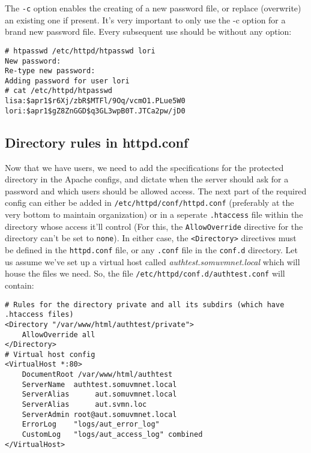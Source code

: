 \noindent
The \verb|-c| option enables the creating of a new password file, or replace (overwrite) an existing one if present. It's very important to only use the -c option for a brand new password file. Every subsequent use should be without any option:

\vspace{-15pt}
\begin{verbatim}
# htpasswd /etc/httpd/htpasswd lori
New password: 
Re-type new password: 
Adding password for user lori
# cat /etc/httpd/htpasswd
lisa:$apr1$r6Xj/zbR$MTFl/9Oq/vcmO1.PLue5W0
lori:$apr1$gZ8ZnGGD$q3GL3wpB0T.JTCa2pw/jD0
\end{verbatim}
\vspace{-15pt}	

\subsection{Directory rules in httpd.conf}
Now that we have users, we need to add the specifications for the protected directory in the Apache configs, and dictate when the server should ask for a password and which users should be allowed access. The next part of the required config can either be added in \verb|/etc/httpd/conf/httpd.conf| (preferably at the very bottom to maintain organization) or in a seperate \verb|.htaccess| file within the directory whose access it'll control (For this, the \verb|AllowOverride| directive for the directory can't be set to \verb|none|). In either case, the \verb|<Directory>| directives must be defined in the \verb|httpd.conf| file, or any \verb|.conf| file in the \verb|conf.d| directory. Let us assume we've set up a virtual host called \textit{authtest.somuvmnet.local} which will house the files we need. So, the file \verb|/etc/httpd/conf.d/authtest.conf| will contain:

\vspace{-15pt}
\begin{verbatim}
# Rules for the directory private and all its subdirs (which have .htaccess files)
<Directory "/var/www/html/authtest/private">
	AllowOverride all
</Directory>
# Virtual host config
<VirtualHost *:80>
	DocumentRoot /var/www/html/authtest
	ServerName 	authtest.somuvmnet.local
	ServerAlias 	 aut.somuvmnet.local
	ServerAlias 	 aut.svmn.loc
	ServerAdmin	root@aut.somuvmnet.local
	ErrorLog 	"logs/aut_error_log"
	CustomLog	"logs/aut_access_log" combined
</VirtualHost>
\end{verbatim}
\vspace{-15pt}	

